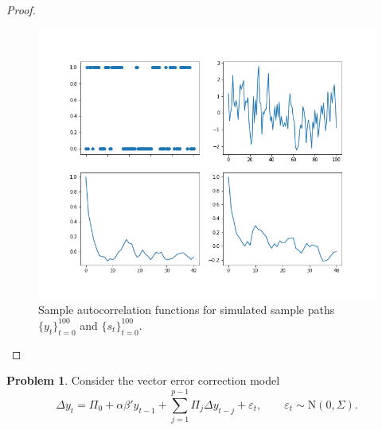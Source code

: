\documentclass[oneside,reqno]{amsart}
\newcommand{\eps}{\varepsilon}
\newcommand{\N}{\mathrm N}
\theoremstyle{definition}
\newtheorem{prob}{Problem}
\begin{document}
\begin{enumerate}[label=(\roman*)]
\begin{proof}
\begin{figure}
\includegraphics[width=\textwidth]{q1-sim}
\caption{Sample autocorrelation functions for simulated sample paths $\{y_t\}_{t=0}^{100}$ and $\{s_t\}_{t=0}^{100}$.}
\label{markov-ar1-acf-fig}
\end{figure}

\end{proof}
\end{enumerate}


\begin{prob}
Consider the vector error correction model
\begin{equation}\label{eq:vecm}
	\Delta y_t = \Pi_0 + \alpha \beta' y_{t-1} + \sum_{j=1}^{p-1} \Pi_j \Delta y_{t-j} + \eps_t, 
	\qquad \eps_t \sim \N(0, \Sigma).
\end{equation}
\end{prob}
\end{document}
